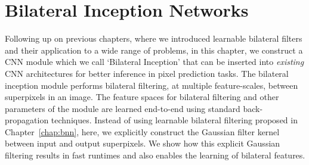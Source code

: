 \chapter{Bilateral Inception Networks}
\label{chap:binception}

\newcommand{\bff}{\mathbf{f}}
\newcommand{\bz}{\mathbf{z}}
\newcommand{\mF}{\mathcal{F}}
\newcommand{\mbF}{\mathcal{\mathbf{F}}}

\newcommand{\deconv}{DeconvNet}
\newcommand{\deconvcrf}{DeconvNet-CRF}
\newcommand{\mincnet}{AlexNet~}
\newcommand{\mincnetcrf}{AlexNet-CRF~}


\newcommand{\deeplablargefov}{DeepLab}
\newcommand{\deeplablargefovcrf}{DeepLab-CRF}
\newcommand{\deeplabmsclargefovcrf}{DeepLab-MSc-CRF}

\newcommand{\deeplab}{DeepLab}
\newcommand{\deeplabcrf}{DeepLab-CRF}
\newcommand{\deeplabstrong}{DeepLab-COCO-Strong}
\newcommand{\deeplabstrongcrf}{DeepLab-COCO-Strong-CRF}
\newcommand{\deeplabmsclargefov}{DeepLab-LargeFOV}

\newcommand{\bi}[2]{BI$_{#1}(#2)$}
\newcommand{\Bi}[1]{BI$_{#1}$}
\newcommand{\gi}[1]{G$(#1)$}
\newcommand{\fc}[1]{FC$_{#1}$}

\hypersetup{
  linkcolor  = black,
  citecolor = black,
  urlcolor   = green!20!black,
  colorlinks = true,
}

\DeclareRobustCommand\onedot{\futurelet\@let@token\@onedot}
\def\onedot{\ifx\let@token.\else.\null\fi\xspace}
\def\eg{\emph{e.g}\onedot} \def\Eg{\emph{E.g}\onedot}
\def\ie{\emph{i.e}\onedot} \def\Ie{\emph{I.e}\onedot}
\def\cf{\emph{c.f}\onedot} \def\Cf{\emph{C.f}\onedot}
\def\wrt{w.r.t\onedot} \def\dof{d.o.f\onedot}

\newcommand{\fix}{\marginpar{FIX}}
\newcommand{\new}{\marginpar{NEW}}

Following up on previous chapters, where we introduced learnable bilateral
filters and their application to a wide range of problems, in this chapter,
we construct a CNN module which we call `Bilateral Inception' that can be
inserted into \emph{existing} CNN architectures for better inference in
pixel prediction tasks.
The bilateral inception module performs bilateral
filtering, at multiple feature-scales, between superpixels in an image.
The feature spaces for bilateral
filtering and other parameters of the module are learned end-to-end using
standard back-propagation techniques.
Instead of using learnable bilateral filtering proposed in Chapter~\ref{chap:bnn},
here, we explicitly construct the Gaussian filter kernel between input
and output superpixels. We show how this explicit Gaussian filtering
results in fast runtimes and also enables the learning of bilateral features.

